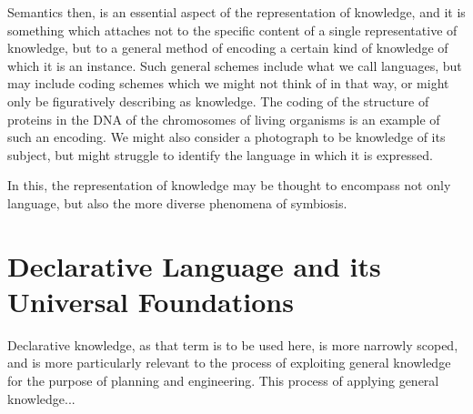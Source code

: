 Semantics then, is an essential aspect of the representation of knowledge, and it is something which attaches not to the specific content of a single representative of knowledge, but to a general method of encoding a certain kind of knowledge of which it is an instance.
Such general schemes include what we call languages, but may include coding schemes which we might not think of in that way, or might only be figuratively describing as knowledge.
The coding of the structure of proteins in the DNA of the chromosomes of living organisms is an example of such an encoding.
We might also consider a photograph to be knowledge of its subject, but might struggle to identify the language in which it is expressed.

In this, the representation of knowledge may be thought to encompass not only language, but also the more diverse phenomena of symbiosis.

\section{Declarative Language and its Universal Foundations}

Declarative knowledge, as that term is to be used here, is more narrowly scoped, and is more particularly relevant to the process of exploiting general knowledge for the purpose of planning and engineering.
This process of applying general knowledge... 

\cite{dretske1981}




